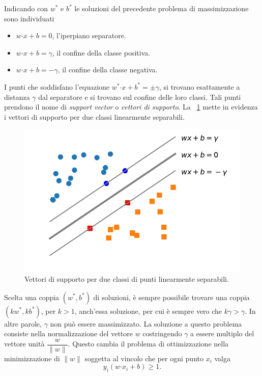 \documentclass [11pt,a4paper,twoside,openright] {book}
\begin{document}
Indicando con $w^*$ e $b^*$ le soluzioni del precedente problema di massimizzazione sono individuati
\begin{itemize}
\item[]$w \boldsymbol{\cdot} x + b = 0$, l'iperpiano separatore.
\item[]$w \boldsymbol{\cdot} x + b = \gamma$, il confine della classe positiva.
\item[]$w \boldsymbol{\cdot} x + b = -\gamma$, il confine della classe negativa.
\end{itemize}
I punti che soddisfano l'equazione $w^* \boldsymbol{\cdot} x + b^* = \pm \gamma$, si trovano esattamente a distanza $\gamma$ dal separatore e si trovano sul confine delle loro classi. Tali punti prendono il nome di \textit{support vector} o \textit{vettori di supporto}. La  \figurename~\ref{supportvector} mette in evidenza i vettori di supporto per due classi linearmente separabili.
\begin{figure}[!h]
\centering
\includegraphics[scale=.6]{figure/supportvectors.pdf}
\caption{Vettori di supporto per due classi di punti linearmente separabili.\label{supportvector}}
\end{figure}Scelta una coppia $(w^*, b^*)$ di soluzioni, è sempre possibile trovare una coppia $(kw^*, kb^*)$, per $k>1$, anch'essa soluzione, per cui è sempre vero che $k\gamma > \gamma$. In altre parole, $\gamma$ non può essere massimizzato. La soluzione a questo problema consiste nella normalizzazione del vettore $w$ costringendo $\gamma$ a essere multiplo del vettore unità $\dfrac{w}{\parallel w \parallel}$. Questo cambia il problema di ottimizzazione nella minimizzazione di $\parallel w \parallel$ soggetta al vincolo che per ogni punto $x_i$ valga
\begin{equation}
y_i(w\boldsymbol{\cdot}x_i + b) \geq 1.
\end{equation}
\end{document}
